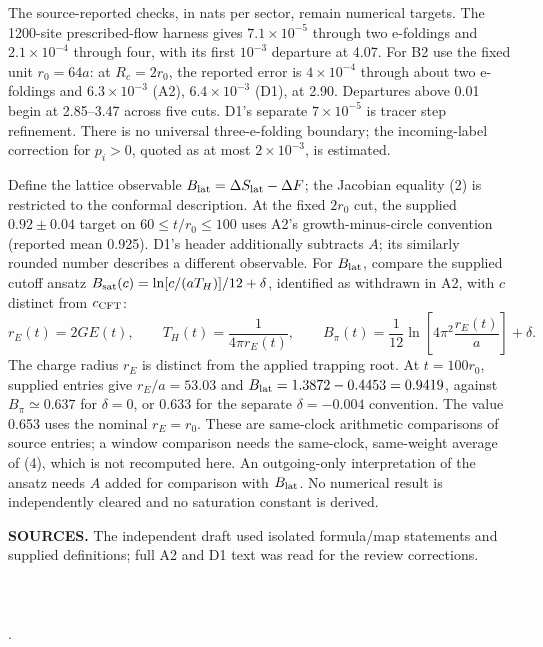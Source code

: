 \documentclass[10pt]{article}
\begin{document}
The source-reported checks, in nats per sector, remain numerical targets.
The 1200-site prescribed-flow harness gives \(7.1\times10^{-5}\)
through two e-foldings and \(2.1\times10^{-4}\) through four,
with its first \(10^{-3}\) departure at 4.07.
For B2 use the fixed unit \(r_0=64a\): at \(R_c=2r_0\), the reported
error is \(4\times10^{-4}\) through about two e-foldings and
\(6.3\times10^{-3}\) (A2), \(6.4\times10^{-3}\) (D1), at 2.90.
Departures above 0.01 begin at 2.85--3.47 across five cuts.
D1's separate \(7\times10^{-5}\) is tracer step refinement.
There is no universal three-e-folding boundary; the incoming-label
correction for \(p_i>0\), quoted as at most \(2\times10^{-3}\), is estimated.

Define the lattice observable \(B_{\rm lat}=\Delta S_{\rm lat}-\Delta F\);
the Jacobian equality (2) is restricted to the conformal description.
At the fixed \(2r_0\) cut, the supplied \(0.92\pm0.04\) target on
\(60\le t/r_0\le100\) uses A2's growth-minus-circle convention
(reported mean 0.925).  D1's header additionally subtracts \(A\);
its similarly rounded number describes a different observable.
For \(B_{\rm lat}\), compare the supplied cutoff ansatz
\(B_{\rm sat}(c)=\ln[c/(aT_H)]/12+\delta\), identified as withdrawn
in A2, with \(c\) distinct from \(c_{\rm CFT}\):
\[
 r_E(t)=2GE(t),\qquad T_H(t)=\frac1{4\pi r_E(t)},\qquad
 B_\pi(t)=\frac1{12}\ln\!\left[4\pi^2\frac{r_E(t)}a\right]+\delta .
 \tag{4}
\]
The charge radius \(r_E\) is distinct from the applied trapping root.
At \(t=100r_0\), supplied entries give \(r_E/a=53.03\) and
\(B_{\rm lat}=1.3872-0.4453=0.9419\), against \(B_\pi\simeq0.637\)
for \(\delta=0\), or 0.633 for the separate \(\delta=-0.004\) convention.
The value 0.653 uses the nominal \(r_E=r_0\).
These are same-clock arithmetic comparisons of source entries;
a window comparison needs the same-clock, same-weight average of (4),
which is not recomputed here.  An outgoing-only interpretation of the
ansatz needs \(A\) added for comparison with \(B_{\rm lat}\).
No numerical result is independently cleared and no saturation constant
is derived.

\vspace{2pt}
{\footnotesize\textbf{SOURCES.} The independent draft used isolated
formula/map statements and supplied definitions; full A2 and D1 text
was read for the review corrections.\\
\\
\\
\\
.}
\end{document}
